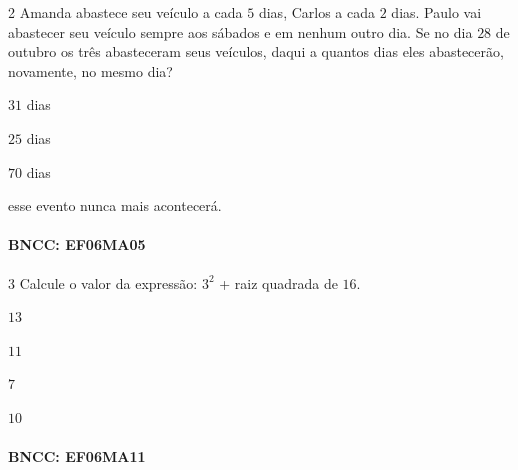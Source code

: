 \num{2}  Amanda abastece seu veículo a cada $5$ dias, Carlos a cada $2$ dias.
Paulo vai abastecer seu veículo sempre aos sábados e em nenhum outro
dia. Se no dia $28$ de outubro os três abasteceram seus veículos, daqui a
quantos dias eles abastecerão, novamente, no mesmo dia?

\begin{escolha}
\item $31$ dias
\item $25$ dias
\item $70$ dias
\item esse evento nunca mais acontecerá.
\end{escolha}

\paragraph{BNCC: EF06MA05 }



\num{3} Calcule o valor da expressão: $3^2$ + raiz quadrada de $16$.

\begin{escolha}
\item $13$
\item $11$
\item $7$
\item $10$
\end{escolha}

\paragraph{BNCC: EF06MA11 }

